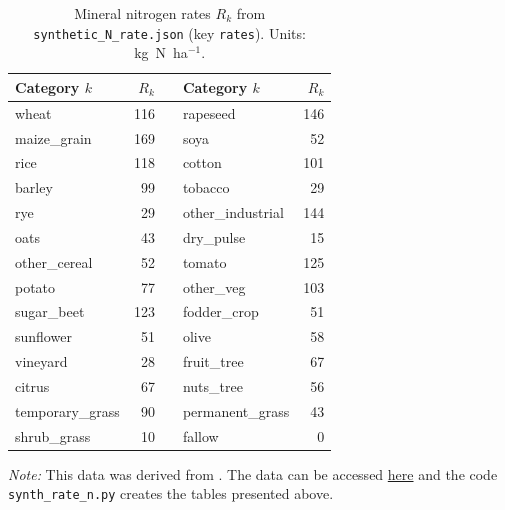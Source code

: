 \begin{table}[htbp]
  \centering
  \begin{threeparttable}
    \caption{Mineral nitrogen rates $R_k$ from \texttt{synthetic\_N\_rate.json} (key \texttt{rates}). Units: kg~N~ha$^{-1}$. }
    \label{tab:synthetic-n-rates}
    \scriptsize
    \setlength{\tabcolsep}{6pt}
    \begin{tabular}{@{}lrr@{\hspace{2em}}lr@{}}
      \toprule
      Category $k$ & $R_k$ & & Category $k$ & $R_k$ \\
      \midrule
      wheat & 116 & & rapeseed & 146 \\
      maize\_grain & 169 & & soya & 52 \\
      rice & 118 & & cotton & 101 \\
      barley & 99 & & tobacco & 29 \\
      rye & 29 & & other\_industrial & 144 \\
      oats & 43 & & dry\_pulse & 15 \\
      other\_cereal & 52 & & tomato & 125 \\
      potato & 77 & & other\_veg & 103 \\
      sugar\_beet & 123 & & fodder\_crop & 51 \\
      sunflower & 51 & & olive & 58 \\
      vineyard & 28 & & fruit\_tree & 67 \\
      citrus & 67 & & nuts\_tree & 56 \\
      temporary\_grass & 90 & & permanent\_grass & 43 \\
      shrub\_grass & 10 & & fallow & 0 \\
      \bottomrule
    \end{tabular}
    
    \begin{tablenotes}
      \footnotesize
      \item \textit{Note:} This data was derived from \citet{einarsson_2021}. The data can be accessed \href{https://figshare.com/articles/dataset/EuropeAgriDB_v1_0_Source_code_and_data/16540314}{here} and the code \texttt{synth\_rate\_n.py} creates the tables presented above.
    \end{tablenotes}
  \end{threeparttable}
\end{table}


